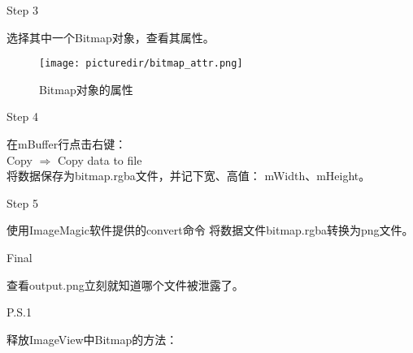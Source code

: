 \documentclass{beamer}
\begin{document}
  \begin{frame}{Step 3}
  \begin{framedtext}
    选择其中一个Bitmap对象，查看其属性。
  \end{framedtext}
  \end{frame}

  \begin{frame}
    \begin{figure}
      \centering
      \texttt{[image: picturedir/bitmap\_attr.png]}\\
      \caption{Bitmap对象的属性}\label{fig:attr}
    \end{figure}
  \end{frame}

  \begin{frame}{Step 4}
  \begin{framedtext}
    在mBuffer行点击右键：\\
    Copy $\Rightarrow$ Copy data to file\\
    将数据保存为bitmap.rgba文件，并记下宽、高值：
    mWidth、mHeight。
  \end{framedtext}
  \end{frame}

  \begin{frame}{Step 5}
  \begin{framedtext}
    使用ImageMagic软件提供的convert命令
    将数据文件bitmap.rgba转换为png文件。
  \end{framedtext}
  \end{frame}

  \begin{frame}
  \end{frame}

  \begin{frame}{Final}
  \begin{framedtext}
    查看output.png立刻就知道哪个文件被泄露了。
  \end{framedtext}
  \end{frame}

  \begin{frame}{P.S.1}
    \begin{framedtext}
      释放ImageView中Bitmap的方法：
    \end{framedtext}
  \end{frame}
\end{document}
